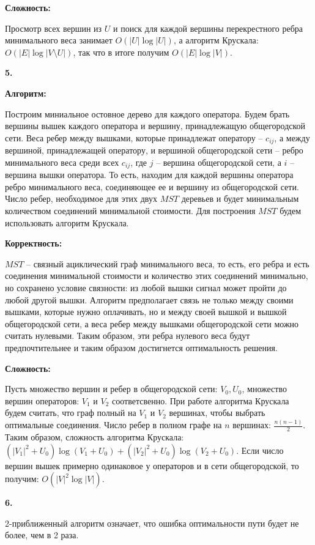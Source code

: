 \documentclass[12pt]{extreport}
\begin{document}
\bigskip 
{\bf Сложность:} 

Просмотр всех вершин из $U$ и поиск для каждой вершины перекрестного ребра минимального веса занимает $O(|U| \log |U|)$, а алгоритм Крускала: $O(|E| \log  |V \setminus U|)$, так что в итоге получим $O(|E| \log |V|)$.

\bigskip 
{\bf 5.} 

{\bf Алгоритм:} 

Построим миниальное остовное дерево для каждого оператора. Будем брать вершины вышек каждого оператора и вершину, принадлежащую общегородской сети. Веса ребер между вышками, которые принадлежат оператору -- $c_{ij}$, а между вершиной, принадлежащей оператору, и вершиной общегородской сети -- ребро минимального веса среди всех $ c_{ij}$, где $j$ -- вершина общегородской сети, а $i$ -- вершина вышки оператора. То есть, находим для каждой вершины оператора ребро минимального веса, соединяющее ее и вершину из общегородской сети. Число ребер, необходимое для этих двух $MST$ деревьев и будет минимальным количеством соединений минимальной стоимости. Для построения $MST$ будем использовать алгоритм Крускала. 

\bigskip 
{\bf Корректность:}

$MST$ -- связный ациклический граф минимального веса, то есть, его ребра и есть соединения минимальной стоимости и количество этих соединений минимально, но сохранено условие связности: из любой вышки сигнал может пройти до любой другой вышки. Алгоритм предполагает связь не только между своими вышками, которые нужно оплачивать, но и между своей вышкой и вышкой общегородской сети, а веса ребер между вышками общегородской сети можно считать нулевыми. Таким образом, эти ребра нулевого веса будут предпочтительнее и таким образом достигнется оптимальность решения. 

\bigskip 
{\bf Сложность:} 

Пусть множество вершин и ребер в общегородской сети: $V_0, U_0$, множество вершин операторов: $V_1$ и $V_2$ соответсвенно. При работе алгоритма Крускала будем считать, что граф полный на $V_1$ и $V_2$ вершинах, чтобы выбрать оптимальные соединения. Число ребер в полном графе на $n$ вершинах: $\frac{n(n-1)}{2}$. Таким образом, сложность алгоритма Крускала: $(|V_1|^2+ U_0) \log{(V_1 + U_0)} + (|V_2|^2+ U_0) \log{(V_2 + U_0)}$. Если число вершин вышек примерно одинаковое у операторов и в сети общегородской, то получим: $O(|V|^2 \log |V|)$.

\bigskip 
{\bf 6.} 

2-приближенный алгоритм означает, что ошибка оптимальности пути будет не более, чем в 2 раза. 
\end{document}
